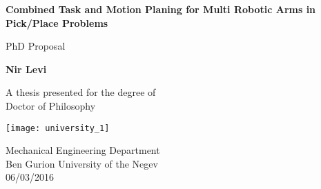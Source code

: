 \begin{titlepage}
    \begin{center}
        \vspace*{1cm}

        \textbf{ Combined Task and Motion Planing for Multi Robotic Arms in Pick/Place Problems}
        
        \vspace{0.5cm}
        PhD Proposal
        
        \vspace{1.5cm}
        
        \textbf{Nir Levi}
        
        \vfill
        
        A thesis presented for the degree of\\
        Doctor of Philosophy
        
        \vspace{0.8cm}
        
        \texttt{[image: university\_1]}
        
        Mechanical Engineering Department\\
        Ben Gurion University of the Negev\\
        06/03/2016
        
    \end{center}
\end{titlepage}